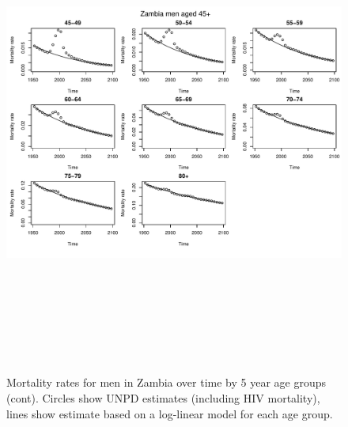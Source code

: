 \documentclass{article}
\begin{document}
\begin{figure}
\includegraphics[width=16cm,height=16cm]{EstimatingRatesFromUNPD-MortalityZamMen2} 

\caption{Mortality rates for men in Zambia over time by 5 year age groups (cont). Circles show UNPD estimates (including HIV mortality), lines show estimate based on a log-linear model for each age group.}
\label{MortalitySAmen1}
\end{figure}
\end{document}
